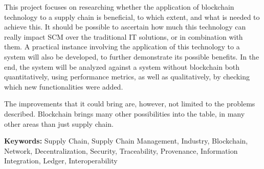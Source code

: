 This project focuses on researching whether the application of  blockchain technology to a supply chain is beneficial, to which extent, and what is needed to achieve this. It should be possible to ascertain how much this technology can really impact SCM over the traditional IT solutions, or in combination with them. A practical instance involving the application of this technology to a system will also be developed, to further demonstrate its possible benefits. In the end, the system will be analyzed against a system without blockchain both quantitatively, using performance metrics, as well as qualitatively, by checking which new functionalities were added.

The improvements that it could bring are, however, not limited to the problems described. Blockchain brings many other possibilities into the table, in many other areas than just supply chain.

\textbf{Keywords:} Supply Chain, Supply Chain Management, Industry, Blockchain, Network, Decentralization, Security, Traceability, Provenance, Information Integration, Ledger, Interoperability






